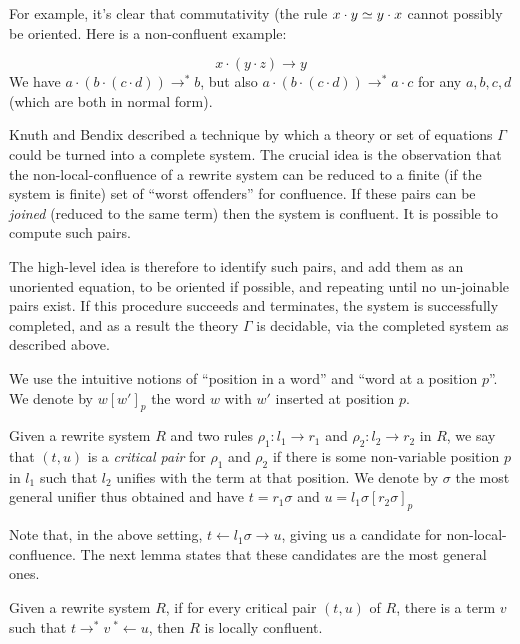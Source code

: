 For example, it's clear that commutativity (the rule $x\cdot y\simeq y\cdot x$ cannot possibly be oriented. Here is a non-confluent example:

\[ x \cdot (y \cdot z) \rightarrow y \]
We have $a\cdot (b \cdot (c \cdot d)) \rightarrow^* b$, but also $a\cdot (b\cdot (c\cdot d))\rightarrow^* a\cdot c$ for any $a, b, c, d$ (which are both in normal form).

Knuth and Bendix \cite{knuth-bendix} described a technique by which a theory or set of equations $\Gamma$ could be turned into a complete system. The crucial idea is the observation that the non-local-confluence of a rewrite system can be reduced to a finite (if the system is finite) set of ``worst offenders'' for confluence. If these pairs can be \emph{joined} (reduced to the same term) then the system is confluent. It is possible to compute such pairs.

The high-level idea is therefore to identify such pairs, and add them as an unoriented equation, to be oriented if possible, and repeating until no un-joinable pairs exist. If this procedure succeeds and terminates, the system is successfully completed, and as a result the theory $\Gamma$ is decidable, via the completed system as described above.

We use the intuitive notions of ``position in a word'' and ``word at a position $p$''. We denote by $w[w']_p$ the word $w$ with $w'$ inserted at position $p$.

\begin{definition}
  Given a rewrite system $R$ and two rules $\rho_1: l_1\rightarrow r_1$ and $\rho_2: l_2\rightarrow r_2$ in $R$, we say that $(t, u)$ is a \emph{critical pair} for $\rho_1$ and $\rho_2$ if there is some non-variable position $p$ in $l_1$ such that $l_2$ unifies with the term at that position. We denote by $\sigma$ the most general unifier thus obtained and have $t = r_1\sigma$ and $u = l_1\sigma[r_2\sigma]_p$
\end{definition}

Note that, in the above setting, $t\leftarrow l_1\sigma\rightarrow u$, giving us a candidate for non-local-confluence. The next lemma states that these candidates are the most general ones.

\begin{theorem}
  Given a rewrite system $R$, if for every critical pair $(t, u)$ of $R$, there is a term $v$ such that $t\rightarrow^* v\ {}^*\leftarrow u$, then $R$ is locally confluent.
\end{theorem}

